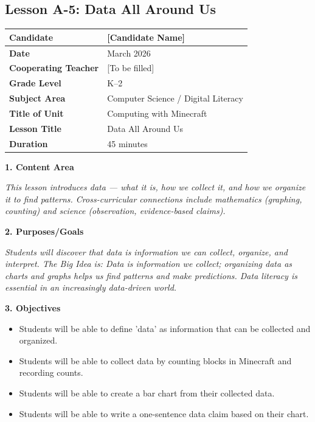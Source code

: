 \documentclass[11pt,letterpaper]{article}
\begin{document}
\newpage
\subsection{Lesson A-5: Data All Around Us}
\label{sub:LessonA5DataAllAroundUs}

\begin{longtable}{|L{0.28\textwidth}|L{0.65\textwidth}|}
\hline
\textbf{Candidate}  & [Candidate Name]  \\
\hline
\textbf{Date}  & March 2026  \\
\hline
\textbf{Cooperating Teacher}  & [To be filled]  \\
\hline
\textbf{Grade Level}  & K--2  \\
\hline
\textbf{Subject Area}  & Computer Science / Digital Literacy  \\
\hline
\textbf{Title of Unit}  & Computing with Minecraft  \\
\hline
\textbf{Lesson Title}  & Data All Around Us  \\
\hline
\textbf{Duration}  & 45 minutes  \\
\hline
\end{longtable}

\textbf{1. Content Area}

\textit{This lesson introduces data --- what it is, how we collect it, and how we organize it to find patterns. Cross-curricular connections include mathematics (graphing, counting) and science (observation, evidence-based claims).}

\textbf{2. Purposes/Goals}

\textit{Students will discover that data is information we can collect, organize, and interpret. The Big Idea is: Data is information we collect; organizing data as charts and graphs helps us find patterns and make predictions. Data literacy is essential in an increasingly data-driven world.}

\textbf{3. Objectives}

\begin{itemize}
  \item Students will be able to define 'data' as information that can be collected and organized.

  \item Students will be able to collect data by counting blocks in Minecraft and recording counts.

  \item Students will be able to create a bar chart from their collected data.

  \item Students will be able to write a one-sentence data claim based on their chart.
\end{itemize}
\end{document}
